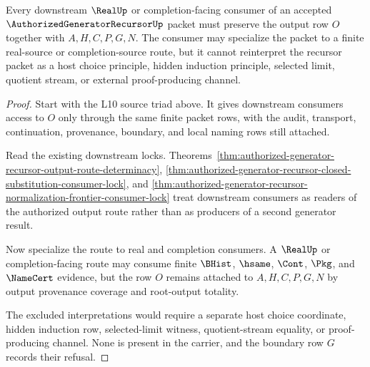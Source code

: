 \begin{theorem}
\label{thm:authorized-generator-recursor-open-phase-consumer-handoff}
Every downstream $\RealUp$ or completion-facing consumer of an accepted $\AuthorizedGeneratorRecursorUp$ packet must preserve the output row $O$ together with $A,H,C,P,G,N$. The consumer may specialize the packet to a finite real-source or completion-source route, but it cannot reinterpret the recursor packet as a host choice principle, hidden induction principle, selected limit, quotient stream, or external proof-producing channel.
\end{theorem}
\begin{proof}
Start with the L10 source triad above. It gives downstream consumers access to $O$ only through the same finite packet rows, with the audit, transport, continuation, provenance, boundary, and local naming rows still attached.

Read the existing downstream locks. Theorems~\ref{thm:authorized-generator-recursor-output-route-determinacy}, \ref{thm:authorized-generator-recursor-closed-substitution-consumer-lock}, and \ref{thm:authorized-generator-recursor-normalization-frontier-consumer-lock} treat downstream consumers as readers of the authorized output route rather than as producers of a second generator result.

Now specialize the route to real and completion consumers. A $\RealUp$ or completion-facing route may consume finite $\BHist$, $\hsame$, $\Cont$, $\Pkg$, and $\NameCert$ evidence, but the row $O$ remains attached to $A,H,C,P,G,N$ by output provenance coverage and root-output totality.

The excluded interpretations would require a separate host choice coordinate, hidden induction row, selected-limit witness, quotient-stream equality, or proof-producing channel. None is present in the carrier, and the boundary row $G$ records their refusal.
\end{proof}

